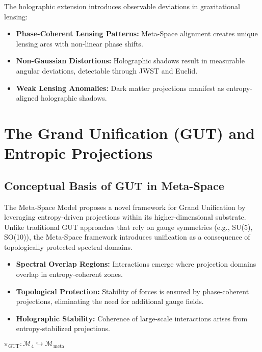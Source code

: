 \documentclass[10.5pt,a4paper]{article}
\begin{document}
The holographic extension introduces observable deviations in gravitational lensing:
\begin{itemize}
    \item \textbf{Phase-Coherent Lensing Patterns:} Meta-Space alignment creates unique lensing arcs with non-linear phase shifts.
    \item \textbf{Non-Gaussian Distortions:} Holographic shadows result in measurable angular deviations, detectable through JWST and Euclid.
    \item \textbf{Weak Lensing Anomalies:} Dark matter projections manifest as entropy-aligned holographic shadows.
\end{itemize}

\clearpage

\section{The Grand Unification (GUT) and Entropic Projections}

\subsection{Conceptual Basis of GUT in Meta-Space}

The Meta-Space Model proposes a novel framework for Grand Unification by leveraging entropy-driven projections within its higher-dimensional substrate. Unlike traditional GUT approaches that rely on gauge symmetries (e.g., SU(5), SO(10)), the Meta-Space framework introduces unification as a consequence of topologically protected spectral domains.

\begin{itemize}
    \item \textbf{Spectral Overlap Regions:} Interactions emerge where projection domains overlap in entropy-coherent zones.
    \item \textbf{Topological Protection:} Stability of forces is ensured by phase-coherent projections, eliminating the need for additional gauge fields.
    \item \textbf{Holographic Stability:} Coherence of large-scale interactions arises from entropy-stabilized projections.
\end{itemize}

\begin{center}
    \( \pi_{\text{GUT}}: \mathcal{M}_4 \hookrightarrow \mathcal{M}_{\text{meta}} \)
\end{center}
\end{document}
